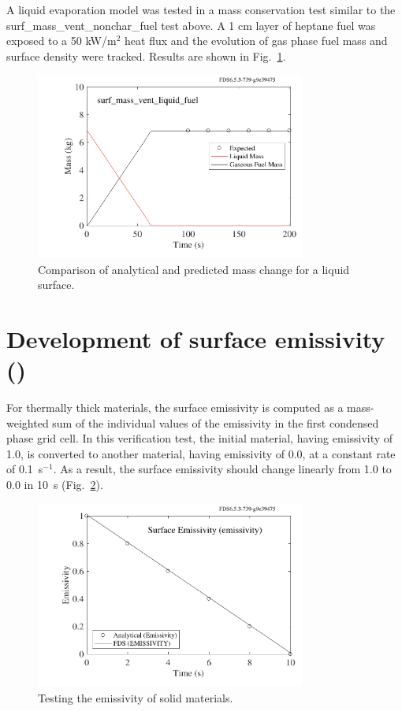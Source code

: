 \documentclass[11pt]{book}
\begin{document}
A liquid evaporation model was tested in a mass conservation test similar to the surf\_mass\_vent\_nonchar\_fuel test above. A 1 cm layer of heptane
fuel was exposed to a 50 kW/m$^2$ heat flux and the evolution of gas phase fuel mass and surface density were tracked. Results are shown in Fig.~\ref{surf_mass_vent_liquid}.
\begin{figure}[ht]
\begin{center}
\includegraphics[width=3.5in]{SCRIPT_FIGURES/surf_mass_vent_liquid_fuel}
\end{center}
\caption[The  test case.]{Comparison of analytical and predicted mass change for a liquid surface.}
\label{surf_mass_vent_liquid}
\end{figure}

\section{Development of surface emissivity (\texorpdfstring{}{emissivity})}

For thermally thick materials, the surface emissivity is computed as a
mass-weighted sum of the individual values of the emissivity
in the first condensed phase grid cell. In this verification test, the
initial material, having emissivity of 1.0, is converted to another
material, having emissivity of 0.0, at a constant rate of 0.1~s$^{-1}$. As a
result, the surface emissivity should change linearly from 1.0 to 0.0 in 10~s (Fig.~\ref{emissivity}).

\begin{figure}[ht]
\begin{center}
\includegraphics[width=3.5in]{SCRIPT_FIGURES/emissivity}
\end{center}
\caption[The  test case]{Testing the emissivity of solid materials.}
\label{emissivity}
\end{figure}
\end{document}
